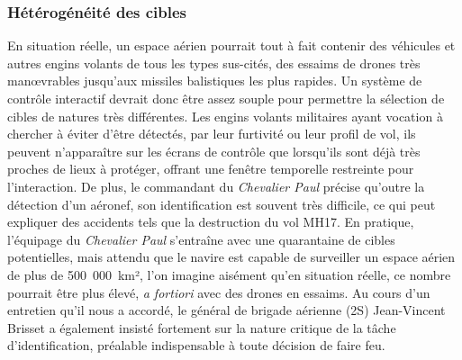 	
	\subsubsection{Hétérogénéité des cibles}
	En situation réelle, un espace aérien pourrait tout à fait contenir des véhicules et autres engins volants de tous les types sus-cités, des essaims de drones très manœvrables jusqu'aux missiles balistiques les plus rapides. Un système de contrôle interactif devrait donc être assez souple pour permettre la sélection de cibles de natures très différentes. Les engins volants militaires ayant vocation à chercher à éviter d'être détectés, par leur furtivité ou leur profil de vol, ils peuvent n'apparaître sur les écrans de contrôle que lorsqu'ils sont déjà très proches de lieux à protéger, offrant une fenêtre temporelle restreinte pour l'interaction. De plus, le commandant du \emph{Chevalier Paul}\footnotemark{} précise qu'outre la détection d'un aéronef, son identification est souvent très difficile, ce qui peut expliquer des accidents tels que la destruction du vol MH17.\footnotemark{} En pratique, l'équipage du \emph{Chevalier Paul} s'entraîne avec une quarantaine de cibles potentielles, mais attendu que le navire est capable de surveiller un espace aérien de plus de 500~000~km², l'on imagine aisément qu'en situation réelle, ce nombre pourrait être plus élevé, \emph{a fortiori} avec des drones en essaims. Au cours d'un entretien qu'il nous a accordé, le général de brigade aérienne (2S) Jean-Vincent Brisset a également insisté fortement sur la nature critique de la tâche d'identification, préalable indispensable à toute décision de faire feu.
	
	\addtocounter{footnote}{-1}
	\addtocounter{footnote}{1}
	
